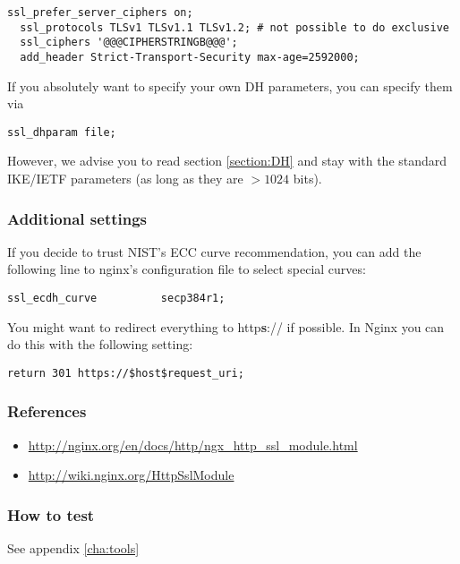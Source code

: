 \begin{lstlisting}[breaklines]
  ssl_prefer_server_ciphers on;
  ssl_protocols TLSv1 TLSv1.1 TLSv1.2; # not possible to do exclusive
  ssl_ciphers '@@@CIPHERSTRINGB@@@';
  add_header Strict-Transport-Security max-age=2592000;
\end{lstlisting}

If you absolutely want to specify your own DH parameters, you can specify them via

\begin{lstlisting}[breaklines]
  ssl_dhparam file;
\end{lstlisting}

However, we advise you to read section \ref{section:DH} and stay with the standard IKE/IETF parameters (as long as they are $ > 1024 $ bits).

\subsubsection{Additional settings}

If you decide to trust NIST's ECC curve recommendation, you can add the following line to nginx's configuration file to select special curves:

\begin{lstlisting}[breaklines]
  ssl_ecdh_curve          secp384r1;
\end{lstlisting}

You might want to redirect everything to http\textbf{s}:// if possible. In Nginx you can do this with the following setting:

\begin{lstlisting}[breaklines]
  return 301 https://$host$request_uri;
\end{lstlisting}


\subsubsection{References} 
\begin{itemize}
\item \url{http://nginx.org/en/docs/http/ngx_http_ssl_module.html}
\item \url{http://wiki.nginx.org/HttpSslModule}
\end{itemize}

\subsubsection{How to test}
See appendix \ref{cha:tools}





